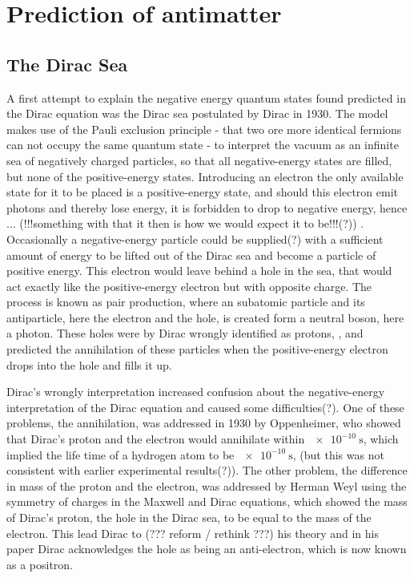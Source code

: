 \chapter{Prediction of antimatter}

\section{The Dirac Sea}
A first attempt to explain the negative energy quantum states found predicted in the Dirac equation was the Dirac sea postulated by Dirac in 1930. The model makes use of the Pauli exclusion principle - that two ore more identical fermions can not occupy the same quantum state - to interpret the vacuum as an infinite sea of negatively charged particles, so that all negative-energy states are filled, but none of the positive-energy states.\cite{bian_deduction_2016} Introducing an electron the only available state for it to be placed is a positive-energy state, and should this electron emit photons and thereby lose energy, it is forbidden to drop to negative energy, hence ... (!!!something with that it then is how we would expect it to be!!!(?)) . Occasionally a negative-energy particle could be supplied(?) with a sufficient amount of energy to be lifted out of the Dirac sea and become a particle of positive energy. This electron would leave behind a hole in the sea, that would act exactly like the positive-energy electron but with opposite charge. The process is known as pair production, where an subatomic particle and its antiparticle, here the electron and the hole, is created form a neutral boson, here a photon. These holes were by Dirac wrongly identified as protons, \cite[p.~363]{dirac_theory_1930}, and predicted the annihilation of these particles when the positive-energy electron drops into the hole and fills it up.

Dirac's wrongly interpretation increased confusion about the negative-energy interpretation of the Dirac equation and caused some difficulties(?). One of these problems, the annihilation, was addressed in 1930 by Oppenheimer, who showed that Dirac's proton and the electron would annihilate within $\SI{e-10}{\second}$, which implied the life time of a hydrogen atom to be $\SI{e-10}{\second}$, (but this was not consistent with earlier experimental results(?)). The other problem, the difference in mass of the proton and the electron, was addressed by Herman Weyl using the symmetry of charges in the Maxwell and Dirac equations, which showed the mass of Dirac's proton, the hole in the Dirac sea, to be equal to the mass of the electron.\cite[sec.~8]{rajasekaran_discovery_2003} This lead Dirac to (??? reform / rethink ???) his theory and in his paper \cite[p.~61]{dirac_quantised_1931} Dirac acknowledges the hole as being an anti-electron, which is now known as a positron.

